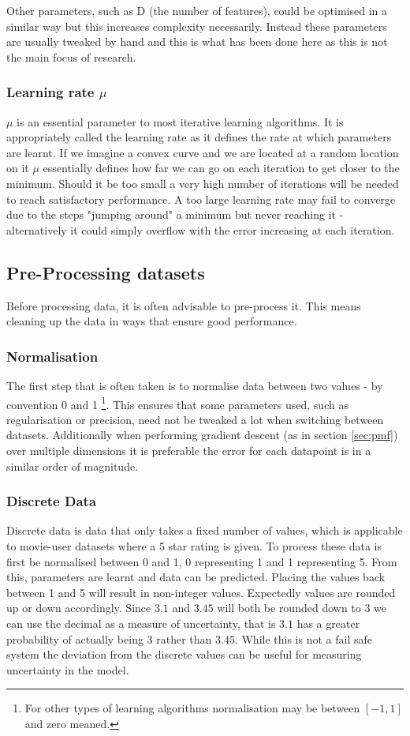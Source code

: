 Other parameters, such as D (the number of features), could be optimised in a similar way but this increases complexity necessarily. Instead these parameters are usually tweaked by hand and this is what has been done here as this is not the main focus of research.
\subsubsection{Learning rate $\mu$}

$\mu$ is an essential parameter to most iterative learning algorithms. It is appropriately called the learning rate as it defines the rate at which parameters are learnt. If we imagine a convex curve and we are located at a random location on it $\mu$ essentially defines how far we can go on each iteration to get closer to the minimum. Should it be too small a very high number of iterations will be needed to reach satisfactory performance. A too large learning rate may fail to converge due to the steps "jumping around" a minimum but never reaching it - alternatively it could simply overflow with the error increasing at each iteration.

\subsection{Pre-Processing datasets}
Before processing data, it is often advisable to pre-process it. This means cleaning up the data in ways that ensure good performance.
\subsubsection{Normalisation}
The first step that is often taken is to normalise data between two values - by convention 0 and 1 \footnote{For other types of learning algorithms normalisation may be between $[-1,1]$ and zero meaned.}. This ensures that some parameters used, such as regularisation or precision, need not be tweaked a lot when switching between datasets. Additionally when performing gradient descent (as in section \ref{sec:pmf}) over multiple dimensions it is preferable the error for each datapoint is in a similar order of magnitude.
\subsubsection{Discrete Data}
Discrete data is data that only takes a fixed number of values, which is applicable to movie-user datasets where a 5 star rating is given. To process these data is first be normalised between 0 and 1, 0 representing 1 and 1 representing 5. From this, parameters are learnt and data can be predicted. Placing the values back between 1 and 5 will result in non-integer values. Expectedly values are rounded up or down accordingly. Since $3.1$ and $3.45$ will both be rounded down to $3$ we can use the decimal as a measure of uncertainty, that is $3.1$ has a greater probability of actually being $3$ rather than $3.45$. While this is not a fail safe system the deviation from the discrete values can be useful for measuring uncertainty in the model.
